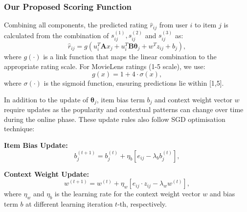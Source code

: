 \documentclass[acmsmall]{acmart}
\begin{document}
\subsubsection{Our Proposed Scoring Function}

Combining all components, the predicted rating $\hat{r}_{ij}$ from user $i$ to item $j$ is calculated from the combination of $s^{(1)}_{ij}, s^{(2)}_{ij}$  and $s^{(3)}_{ij}$ as: 
\begin{equation}
\hat{r}_{ij} = g\left(u_i^T \mathbf{A} x_j + u_i^T \mathbf{B} \boldsymbol{\theta}_j + w^T z_{ij} + b_j\right),
\label{eq:complete_scoring}
\end{equation}
where $g(\cdot)$ is a link function that maps the linear combination to the appropriate rating scale. For MovieLens ratings (1-5 scale), we use:
\begin{equation}
g(x) = 1 + 4 \cdot \sigma(x),
\label{eq:link_function}
\end{equation}
where $\sigma(\cdot)$ is the sigmoid function, ensuring predictions lie within [1,5].

In addition to the update of $\boldsymbol{\theta}_j$, item bias term $b_j$ and context weight vector $w$ require updates as the popularity and contextual patterns can change over time during the online phase. These update rules also follow SGD optimisation technique: 


\textbf{Item Bias Update:}
\begin{equation}
b_j^{(t+1)} = b_j^{(t)} + \eta_b \left[e_{ij} - \lambda_b b_j^{(t)}\right],
\end{equation}

\textbf{Context Weight Update:}
\begin{equation}
w^{(t+1)} = w^{(t)} + \eta_w \left[e_{ij} \cdot z_{ij} - \lambda_w w^{(t)}\right],
\end{equation}
where $\eta_w$ and $\eta_b$ is the learning rate for the context weight vector $w$ and bias term $b$ at different learning iteration $t$-th, respectively.

\end{document}
